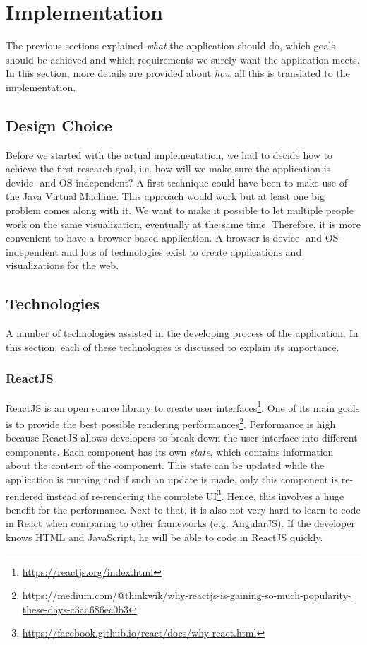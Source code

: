 \chapter{Implementation}\label{ch:implementation}

The previous sections explained \textit{what} the application should do, which goals should be achieved and which requirements we surely want the application meets. In this section, more details are provided about \textit{how} all this is translated to the implementation.

\section{Design Choice}
Before we started with the actual implementation, we had to decide how to achieve the first research goal, i.e. how will we make sure the application is devide- and OS-independent? A first technique could have been to make use of the Java Virtual Machine. This approach would work but at least one big problem comes along with it. We want to make it possible to let multiple people work on the same visualization, eventually at the same time. Therefore, it is more convenient to have a browser-based application. A browser is device- and OS-independent and lots of technologies exist to create applications and visualizations for the web.

\section{Technologies}\label{sec:technologies}
A number of technologies assisted in the developing process of the application. In this section, each of these technologies is discussed to explain its importance.

\subsection{ReactJS}\label{sec:reactjs}
ReactJS is an open source library to create user interfaces\footnote{\url{https://reactjs.org/index.html}}. One of its main goals is to provide the best possible rendering performances\footnote{\url{https://medium.com/@thinkwik/why-reactjs-is-gaining-so-much-popularity-these-days-c3aa686ec0b3}}. Performance is high because ReactJS allows developers to break down the user interface into different components. Each component has its own \textit{state}, which contains information about the content of the component. This state can be updated while the application is running and if such an update is made, only this component is re-rendered instead of re-rendering the complete UI\footnote{\url{https://facebook.github.io/react/docs/why-react.html}}. Hence, this involves a huge benefit for the performance. Next to that, it is also not very hard to learn to code in React when comparing to other frameworks (e.g. AngularJS). If the developer knows HTML and JavaScript, he will be able to code in ReactJS quickly.\\

